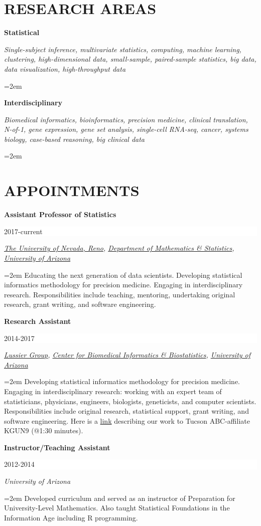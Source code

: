 \documentclass[paper=a4,fontsize=11pt]{scrartcl} %
\newcommand{\sepspace}{\vspace*{1em}}		%
\newcommand{\NewPart}[2]{\section*{\uppercase{#1} #2 }}
\newcommand{\EducationEntry}[4]{
		\noindent \textbf{#1} \hfill      %
		\colorbox{White}{%
			\parbox{6em}{%
			\hfill\color{Black}#2}} \par  %
		\noindent \textit{#3} \par        %
		\noindent\hangindent=2em\hangafter=0 \small #4 %
		\normalsize \par \vspace{-7pt}}
\begin{document}
\NewPart{Research areas}{}
\vspace{-7pt}

\EducationEntry{Statistical}{}{Single-subject inference, multivariate statistics, computing, machine learning, clustering, high-dimensional data, small-sample, paired-sample statistics, big data, data visualization, high-throughput data}{}

\EducationEntry{Interdisciplinary}{}{Biomedical informatics, bioinformatics, precision medicine, clinical translation, N-of-1, gene expression, gene set analysis, single-cell RNA-seq, cancer, systems biology, case-based reasoning, big clinical data}{}

\NewPart{Appointments}{}
\vspace{-7pt}

\EducationEntry{Assistant Professor of Statistics}{2017-current}{{\href{https://www.unr.edu/}{The University of Nevada, Reno}}, {\href{https://www.unr.edu/math/}{Department of Mathematics \& Statistics}}, {\href{http://www.arizona.edu/}{University of Arizona}}}{Educating the next generation of data scientists. Developing statistical informatics methodology for precision medicine. Engaging in interdisciplinary research. Responsibilities include teaching, mentoring, undertaking original research, grant writing, and software engineering.}
\sepspace

\EducationEntry{Research Assistant}{2014-2017}{{\href{http://lussierlab.org/}{Lussier Group}}, {\href{http://cb2.uahs.arizona.edu/}{Center for Biomedical Informatics \& Biostatistics}}, {\href{http://www.arizona.edu/}{University of Arizona}}}{Developing statistical informatics methodology for precision medicine. Engaging in interdisciplinary research: working with an expert team of statisticians, physicians, engineers, biologists, geneticists, and computer scientists. Responsibilities include original research, statistical support, grant writing, and software engineering. Here is a \href{http://cb2.uahs.arizona.edu/news/dr-lussier-and-grant-schissler-speak-big-data-kgun9-local-news}{link} describing our work to Tucson ABC-affiliate KGUN9 (@1:30 minutes).}
\sepspace

\EducationEntry{Instructor/Teaching Assistant}{2012-2014}{University of Arizona}
{Developed curriculum and served as an instructor of Preparation for University-Level Mathematics. Also taught Statistical Foundations in the Information Age including \textsc{R} programming.}
\sepspace
\end{document}
